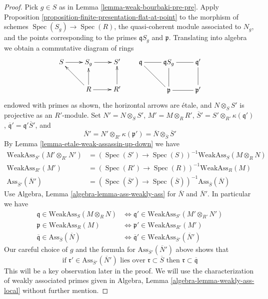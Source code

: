 \documentclass[10pt,a4paper]{amsart}
\theoremstyle{plain}
\theoremstyle{definition}
\theoremstyle{remark}
\numberwithin{equation}{subsection}
\def\Spec{\mathop{\mathrm{Spec}}}
\begin{document}
\begin{proof}
Pick $g \in S$ as in Lemma \ref{lemma-weak-bourbaki-pre-pre}.
Apply Proposition \ref{proposition-finite-presentation-flat-at-point}
to the morphism of schemes $\Spec(S_g) \to \Spec(R)$, the quasi-coherent
module associated to $N_g$, and the points
corresponding to the primes $\mathfrak qS_g$ and $\mathfrak p$. Translating
into algebra we obtain a commutative diagram of rings
$$
\xymatrix{
S \ar[r] & S_g \ar[r] & S' \\
& R \ar[lu] \ar[u] \ar[r] & R' \ar[u]
}
\quad\quad
\xymatrix{
\mathfrak q \ar@{-}[r] \ar@{-}[rd] &
\mathfrak qS_g \ar@{-}[d] \ar@{-}[r] & \mathfrak q' \ar@{-}[d] \\
& \mathfrak p \ar@{-}[r] & \mathfrak p'
}
$$
endowed with primes as shown, the horizontal arrows are \'etale,
and $N \otimes_S S'$ is projective as an $R'$-module. Set
$N' = N \otimes_S S'$, $M' = M \otimes_R R'$,
$\overline{S}' = S' \otimes_{R'} \kappa(\mathfrak q')$,
$\overline{\mathfrak q}' = \mathfrak q' \overline{S}'$,
and
$$
\overline{N}' = N' \otimes_{R'} \kappa(\mathfrak p') =
\overline{N} \otimes_{\overline{S}} \overline{S}'
$$
By Lemma \ref{lemma-etale-weak-assassin-up-down} we have
\begin{align*}
\text{WeakAss}_{S'}(M' \otimes_{R'} N') & =
(\Spec(S') \to \Spec(S))^{-1}\text{WeakAss}_S(M \otimes_R N) \\
\text{WeakAss}_{R'}(M') & =
(\Spec(R') \to \Spec(R))^{-1}\text{WeakAss}_R(M) \\
\text{Ass}_{\overline{S}'}(\overline{N}') & =
(\Spec(\overline{S}') \to \Spec(\overline{S}))^{-1}
\text{Ass}_{\overline{S}}(\overline{N})
\end{align*}
Use Algebra, Lemma \ref{algebra-lemma-ass-weakly-ass}
for $\overline{N}$ and $\overline{N}'$. In particular we have
\begin{align*}
\mathfrak q \in \text{WeakAss}_S(M \otimes_R N)
& \Leftrightarrow
\mathfrak q' \in \text{WeakAss}_{S'}(M' \otimes_{R'} N') \\
\mathfrak p \in \text{WeakAss}_R(M)
& \Leftrightarrow
\mathfrak p' \in \text{WeakAss}_{R'}(M') \\
\overline{\mathfrak q} \in \text{Ass}_{\overline{S}}(\overline{N})
& \Leftrightarrow
\overline{\mathfrak q}' \in \text{WeakAss}_{\overline{S}'}(\overline{N}')
\end{align*}
Our careful choice of $g$ and the formula for
$\text{Ass}_{\overline{S}'}(\overline{N}')$ above shows that
\begin{equation}
\label{equation-key-observation}
\text{if }\mathfrak r' \in \text{Ass}_{\overline{S}'}(\overline{N}')
\text{ lies over }\mathfrak r \subset \overline{S}\text{ then }
\mathfrak r \subset \overline{\mathfrak q}
\end{equation}
This will be a key observation later in the proof. We will use
the characterization of weakly associated primes given in
Algebra, Lemma \ref{algebra-lemma-weakly-ass-local} without further mention.


\end{proof}
\end{document}
